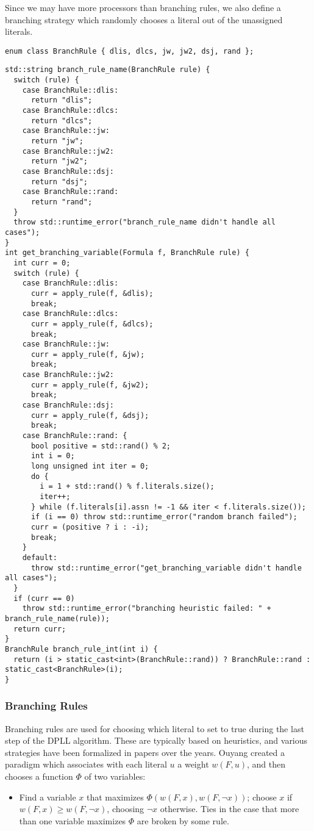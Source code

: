 \documentclass[10pt,AMS Euler]{article}
\begin{document}
Since we may have more processors than branching rules, we also define a
branching strategy which randomly chooses a literal out of the unassigned
literals.

\begin{verbatim}
enum class BranchRule { dlis, dlcs, jw, jw2, dsj, rand };
\end{verbatim}
\begin{verbatim}
std::string branch_rule_name(BranchRule rule) {
  switch (rule) {
    case BranchRule::dlis:
      return "dlis";
    case BranchRule::dlcs:
      return "dlcs";
    case BranchRule::jw:
      return "jw";
    case BranchRule::jw2:
      return "jw2";
    case BranchRule::dsj:
      return "dsj";
    case BranchRule::rand:
      return "rand";
  }
  throw std::runtime_error("branch_rule_name didn't handle all cases");
}
int get_branching_variable(Formula f, BranchRule rule) {
  int curr = 0;
  switch (rule) {
    case BranchRule::dlis:
      curr = apply_rule(f, &dlis);
      break;
    case BranchRule::dlcs:
      curr = apply_rule(f, &dlcs);
      break;
    case BranchRule::jw:
      curr = apply_rule(f, &jw);
      break;
    case BranchRule::jw2:
      curr = apply_rule(f, &jw2);
      break;
    case BranchRule::dsj:
      curr = apply_rule(f, &dsj);
      break;
    case BranchRule::rand: {
      bool positive = std::rand() % 2;
      int i = 0;
      long unsigned int iter = 0;
      do {
        i = 1 + std::rand() % f.literals.size();
        iter++;
      } while (f.literals[i].assn != -1 && iter < f.literals.size());
      if (i == 0) throw std::runtime_error("random branch failed");
      curr = (positive ? i : -i);
      break;
    }
    default:
      throw std::runtime_error("get_branching_variable didn't handle all cases");
  }
  if (curr == 0)
    throw std::runtime_error("branching heuristic failed: " + branch_rule_name(rule));
  return curr;
}
BranchRule branch_rule_int(int i) {
  return (i > static_cast<int>(BranchRule::rand)) ? BranchRule::rand : static_cast<BranchRule>(i);
}
\end{verbatim}

\subsubsection{Branching Rules}
\label{sec:org3d2a36f}
Branching rules are used for choosing which literal to set to true during
the last step of the DPLL algorithm. These are typically based on heuristics,
and various strategies have been formalized in papers over the years.
Ouyang \cite{ouyang} created a paradigm which associates with each literal \(u\) a weight \(w(F, u)\),
and then chooses a function \(\Phi\) of two variables:
\begin{itemize}
\item Find a variable \(x\) that maximizes \(\Phi(w(F,x), w(F, \neg x))\); choose \(x\) if
\(w(F, x) \geq w(F,\neg x)\), choosing \(\neg x\) otherwise. Ties in the case that more
than one variable maximizes \(\Phi\) are broken by some rule.
\end{itemize}
\end{document}
